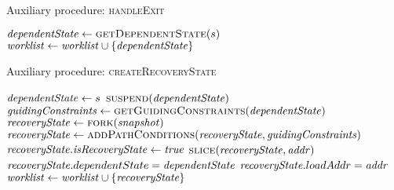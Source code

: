 \begin{algorithm}
  \caption{Auxiliary procedure: \textsc{handleExit}
  \label{fig:aux-func-recS}}
\begin{algorithmic}[1]

 \label{alg:exit-check-recovery}
  \State {} \label{alg:exit-terminate-recovery}
  \State $\dependentState \gets  \Call{getDependentState}{\workstate}$ \label{alg:exit-extract-dependent}
  \State {} \label{alg:exit-resume}
  \State $\mathit{worklist} \gets  \mathit{worklist} \cup \{\mathit{dependentState}\}$
\Else
  \State {}  \label{alg:exit-normal}
  \label{alg:push-worklist-exit}
\EndIf
\EndFunction
\end{algorithmic}
\end{algorithm}

\begin{algorithm}
  \caption{Auxiliary procedure: \textsc{createRecoveryState}
  \label{fig:aux-func-recS}}
\begin{algorithmic}[1]

   \label{alg:recover-foreach}
     \label{alg:recover-if-found}
       \State $\mathit{dependentState} \gets s$ \label{alg:recover-gen-depS}
       \State $\Call{suspend}{\dependentState}$ \label{alg:recover-suspend}
       \State $\gc \gets  \Call{getGuidingConstraints}{\dependentState}$ \label{alg:recover-get-gc}
       \State $\recoveryState \gets \Call{fork}{\snapshot}$ \label{alg:recover-gen-recS}
       \State $\recoveryState \gets \Call{addPathConditions}{\recoveryState,\gc}$ \label{alg:add-guiding-constraints}
       \State $\mathit{recoveryState}.\mathit{isRecoveryState} \gets \mathit{true}$ \label{alg:recover-set-is-recS}
       \State $\Call{slice}{\recoveryState,\addr}$ \label{alg:recover-slice}
       \State $\mathit{recoveryState}.dependentState = \mathit{dependentState}$ \label{alg:set-dependent-state}
       \State $\mathit{recoveryState}.loadAddr = \mathit{addr}$ \label{alg:set-load-addr}
       \State $\mathit{worklist} \gets \mathit{worklist} \cup \{\mathit{recoveryState}\}$
       \label{alg:push-worklist-recovery}
    \EndIf
  \EndFor
\EndFunction
\end{algorithmic}
\end{algorithm}


